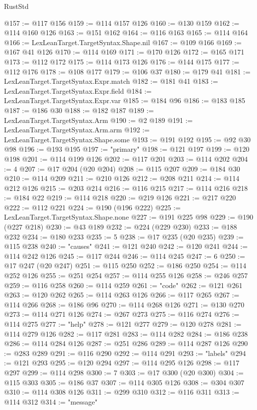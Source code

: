 \begin{lexlean}{RustStd}
\begin{coremodule}
{\begin{coremodule}
{{{{{{{{{{{{{{{{{{{{{{{{{{{{{{{{{{{{{{{{{{{{{{{{{{@157 := @117 @156
@159 := @114 @157 @126
@160 := @130 @159
@162 := @114 @160 @126
@163 := @151 @162
@164 := @116 @163
@165 := @114 @164
@166 := LexLeanTarget.TargetSyntax.Shape.nil
@167 := @109 @166
@169 := @167 @41 @126
@170 := @114 @169
@171 := @170 @126
@172 := @165 @171
@173 := @112 @172
@175 := @114 @173 @126
@176 := @144 @175
@177 := @112 @176
@178 := @108 @177
@179 := @106 @37
@180 := @179 @41
@181 := LexLeanTarget.TargetSyntax.Expr.match
@182 := @181 @41
@183 := LexLeanTarget.TargetSyntax.Expr.field
@184 := LexLeanTarget.TargetSyntax.Expr.var
@185 := @184 @96
@186 := @183 @185
@187 := @186 @30
@188 := @182 @187
@189 := LexLeanTarget.TargetSyntax.Arm
@190 := @2 @189
@191 := LexLeanTarget.TargetSyntax.Arm.arm
@192 := LexLeanTarget.TargetSyntax.Shape.some
@193 := @191 @192
@195 := @92 @30 @98
@196 := @193 @195
@197 := "primary"
@198 := @121 @197
@199 := @120 @198
@201 := @114 @199 @126
@202 := @117 @201
@203 := @114 @202
@204 := 4
@207 := @17 @204 (@20 @204)
@208 := @115 @207
@209 := @184 @30
@210 := @114 @209
@211 := @210 @126
@212 := @208 @211
@214 := @114 @212 @126
@215 := @203 @214
@216 := @116 @215
@217 := @114 @216
@218 := @184 @22
@219 := @114 @218
@220 := @219 @126
@221 := @217 @220
@222 := @112 @221
@224 := @190 (@196 @222)
@225 := LexLeanTarget.TargetSyntax.Shape.none
@227 := @191 @225 @98
@229 := @190 (@227 @218)
@230 := @43 @189
@232 := @224 (@229 @230)
@233 := @188 @232
@234 := @180 @233
@235 := 5
@238 := @17 @235 (@20 @235)
@239 := @115 @238
@240 := "causes"
@241 := @121 @240
@242 := @120 @241
@244 := @114 @242 @126
@245 := @117 @244
@246 := @114 @245
@247 := 6
@250 := @17 @247 (@20 @247)
@251 := @115 @250
@252 := @186 @250
@254 := @114 @252 @126
@255 := @251 @254
@257 := @114 @255 @126
@258 := @246 @257
@259 := @116 @258
@260 := @114 @259
@261 := "code"
@262 := @121 @261
@263 := @120 @262
@265 := @114 @263 @126
@266 := @117 @265
@267 := @114 @266
@268 := @186 @96
@270 := @114 @268 @126
@271 := @130 @270
@273 := @114 @271 @126
@274 := @267 @273
@275 := @116 @274
@276 := @114 @275
@277 := "help"
@278 := @121 @277
@279 := @120 @278
@281 := @114 @279 @126
@282 := @117 @281
@283 := @114 @282
@284 := @186 @238
@286 := @114 @284 @126
@287 := @251 @286
@289 := @114 @287 @126
@290 := @283 @289
@291 := @116 @290
@292 := @114 @291
@293 := "labels"
@294 := @121 @293
@295 := @120 @294
@297 := @114 @295 @126
@298 := @117 @297
@299 := @114 @298
@300 := 7
@303 := @17 @300 (@20 @300)
@304 := @115 @303
@305 := @186 @37
@307 := @114 @305 @126
@308 := @304 @307
@310 := @114 @308 @126
@311 := @299 @310
@312 := @116 @311
@313 := @114 @312
@314 := "message"
}}}}}}}}}}}}}}}}}}}}}}}}}}}}}}}}}}}}}}}}}}}}}}}}}}
\end{coremodule}}
\end{coremodule}
\end{lexlean}
